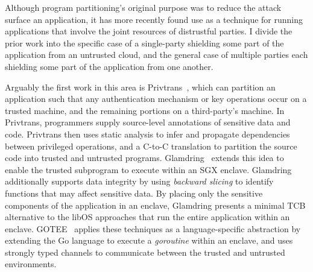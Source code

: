 Although program partitioning's original purpose was to reduce the attack
surface an application, it has more recently found use as a technique for
running applications that involve the joint resources of distrustful parties.
%
I divide the prior work into the specific case of a single-party shielding
some part of the application from an untrusted cloud, and the general case of
multiple parties each shielding some part of the application from one another.


%
Arguably the first work in this area is Privtrans~\cite{privtrans}, which
can partition an application such that any authentication mechanism or key
operations occur on a trusted machine, and the remaining portions on a
third-party's machine.
%
In Privtrans, programmers supply source-level annotations of sensitive data and
code.
%
Privtrans then uses static analysis to infer and propagate dependencies between
privileged operations, and a C-to-C translation to partition the source code
into trusted and untrusted programs.
%
Glamdring~\cite{glamdring} extends this idea to enable the trusted
subprogram to execute within an SGX enclave.
%
Glamdring additionally supports data integrity by using \emph{backward
slicing} to identify functions that may affect sensitive data.
%
By placing only the sensitive components of the application in an enclave,
Glamdring presents a minimal TCB alternative to the libOS approaches that
run the entire application within an enclave.
%
GOTEE~\cite{secured-routines} applies these techniques as  a language-specific
abstraction by extending the Go language to execute a \emph{goroutine} within
an enclave, and uses strongly typed channels to communicate between the trusted
and untrusted environments.




